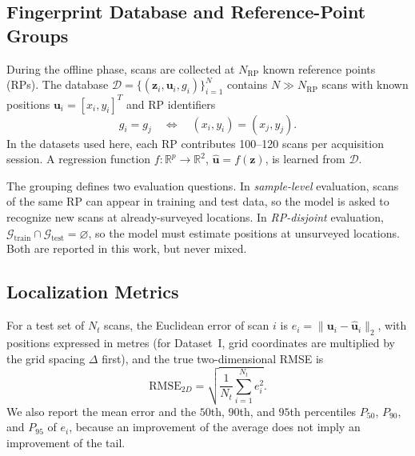\subsection{Fingerprint Database and Reference-Point Groups}

During the offline phase, scans are collected at $N_{\mathrm{RP}}$ known reference points (RPs). The database $\mathcal{D}=\{(\mathbf{z}_{i},\mathbf{u}_{i},g_i)\}_{i=1}^{N}$ contains $N\gg N_{\mathrm{RP}}$ scans with known positions $\mathbf{u}_{i}=[x_i,y_i]^{T}$ and RP identifiers
\begin{equation}
	g_i=g_j
	\quad\Longleftrightarrow\quad
	(x_i,y_i)=(x_j,y_j).
	\label{eq:rp_group}
\end{equation}
In the datasets used here, each RP contributes 100--120 scans per acquisition session. A regression function $f:\mathbb{R}^{p}\rightarrow\mathbb{R}^{2}$, $\hat{\mathbf{u}}=f(\mathbf{z})$, is learned from $\mathcal{D}$.

The grouping defines two evaluation questions. In \emph{sample-level} evaluation, scans of the same RP can appear in training and test data, so the model is asked to recognize new scans at already-surveyed locations. In \emph{RP-disjoint} evaluation, $\mathcal{G}_{\mathrm{train}}\cap\mathcal{G}_{\mathrm{test}}=\varnothing$, so the model must estimate positions at unsurveyed locations. Both are reported in this work, but never mixed.

\subsection{Localization Metrics}
\label{subsec:metrics}

For a test set of $N_t$ scans, the Euclidean error of scan $i$ is $e_i=\|\mathbf{u}_{i}-\hat{\mathbf{u}}_{i}\|_{2}$, with positions expressed in metres (for Dataset~I, grid coordinates are multiplied by the grid spacing $\Delta$ first), and the true two-dimensional RMSE is
\begin{equation}
	\mathrm{RMSE}_{2D}
	=
	\sqrt{\frac{1}{N_t}\sum_{i=1}^{N_t}e_i^{2}}.
	\label{eq:rmse2d}
\end{equation}
We also report the mean error and the $50$th, $90$th, and $95$th percentiles $P_{50}$, $P_{90}$, and $P_{95}$ of $e_i$, because an improvement of the average does not imply an improvement of the tail.

